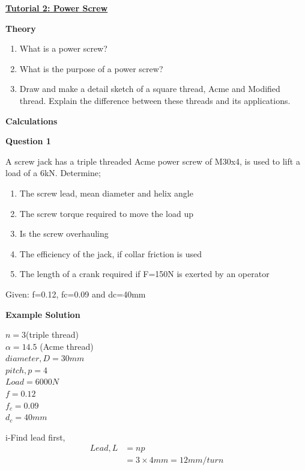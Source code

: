 \documentclass[a4paper, fleqn]{article}
\begin{document}
\underline{\textbf{\large Tutorial 2: Power Screw}}
\vspace{10pt}

\textbf{Theory}

\begin{enumerate}
    \item What is a power screw?
    \item What is the purpose of a power screw?
    \item Draw and make a detail sketch of a square thread, Acme and Modified thread. Explain the difference between these threads and its applications.
\end{enumerate}

\textbf{Calculations}
\vspace{10pt}

\textbf{Question 1}

A screw jack has a triple threaded Acme power screw of M30x4, is used to lift a load of a 6kN. Determine;

\begin{enumerate}[label=(\roman*)]
    \item The screw lead, mean diameter and helix angle
    \item The screw torque required to move the load up
    \item Is the screw overhauling
    \item The efficiency of the jack, if collar friction is used
    \item The length of a crank required if F=150N is exerted by an operator
\end{enumerate}

Given: f=0.12, fc=0.09 and dc=40mm

\vspace{10pt}
\textbf{Example Solution}
\vspace{10pt}

$n = 3$(triple thread)\\
$\alpha = 14.5$ (Acme thread)\\
$diameter,D = 30mm$\\
$pitch,p = 4$\\
$Load = 6000N$\\
$f = 0.12$\\
$f_c = 0.09$\\
$d_c = 40mm$\\
\vspace{10pt}

i-Find lead first,
\begin{equation*}
    \begin{aligned}
    Lead, L &=np\\
    &=3\times4mm = 12mm/turn    
    \end{aligned}
\end{equation*}
\end{document}
